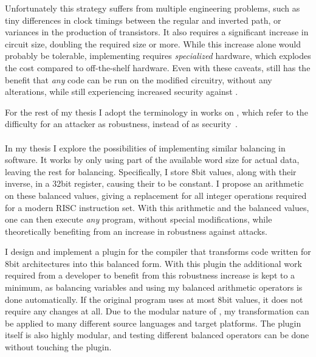 Unfortunately this strategy suffers from multiple engineering problems, such as tiny differences in clock timings between the regular and inverted path\cite{baddam2008path}, or variances in the production of transistors\cite{razafindraibe2006formal}.
It also requires a significant increase in circuit size, doubling the required size or more\cite{baddam2008path}.
While this increase alone would probably be tolerable, implementing \dual{} requires \emph{specialized} hardware, which explodes the cost compared to off-the-shelf hardware.
Even with these caveats, \dual{} still has the benefit that \emph{any} code can be run on the modified circuitry, without any alterations, while still experiencing increased security against \poweranalysis{}.

For the rest of my thesis I adopt the terminology in works on \dual{}, which refer to the difficulty for an attacker as robustness, instead of as security~\cite{soares2008evaluating,razafindraibe2006formal}.
\\
\\
In my thesis I explore the possibilities of implementing similar balancing in software.
It works by only using part of the available word size for actual data, leaving the rest for balancing.
Specifically, I store 8bit values, along with their inverse, in a 32bit register, causing their \hammingw{} to be constant.
I propose an arithmetic on these balanced values, giving a replacement for all integer operations required for a modern RISC instruction set.
With this arithmetic and the balanced values, one can then execute \emph{any} program, without special modifications, while theoretically benefiting from an increase in robustness against \poweranalysis{} attacks.

I design and implement a plugin for the \llvm{} compiler that transforms code written for 8bit architectures into this balanced form.
With this plugin the additional work required from a developer to benefit from this robustness increase is kept to a minimum, as balancing variables and using my balanced arithmetic operators is done automatically.
If the original program uses at most 8bit values, it does not require any changes at all.
Due to the modular nature of \llvm{}, my transformation can be applied to many different source languages and target platforms.
The plugin itself is also highly modular, and testing different balanced operators can be done without touching the plugin.

